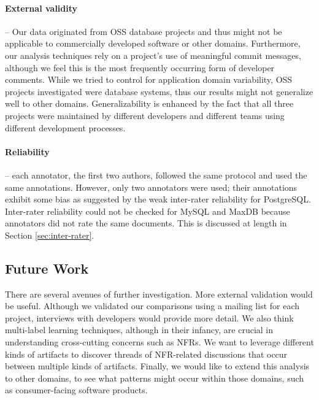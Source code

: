 \documentclass[smallextended]{svjour3}       %
\begin{document}
\paragraph{External validity} -- %
Our data originated from OSS database projects and thus might not be applicable to commercially developed software or other domains. 
Furthermore, our analysis techniques rely on a project's use of meaningful commit messages, although we feel this is the most frequently occurring form
of developer comments. 
While we tried to control for application domain variability, OSS
projects investigated were database systems, thus our results might
not generalize well to other domains. Generalizability is enhanced by
the fact that all three projects
were maintained by different developers and different teams using
different development processes.


\paragraph{Reliability} -- each annotator, the first two authors, followed the same protocol and used the same annotations. 
However, only two annotators were used; their annotations exhibit some
bias as suggested by the weak inter-rater reliability for
PostgreSQL. Inter-rater reliability could not be checked for MySQL and
MaxDB because annotators did not rate the same documents. This is discussed at length in Section \ref{sec:inter-rater}.

\subsection{Future Work}
There are several avenues of further investigation.  
More external validation would be useful. 
Although we validated our comparisons using a mailing list for each project, interviews with developers would provide more detail. 
We also think multi-label learning techniques, although in their infancy, are crucial in understanding cross-cutting concerns such as NFRs. 
We want to leverage different kinds of artifacts to discover threads of NFR-related discussions that occur between multiple kinds of artifacts.
Finally, we would like to extend this analysis to other domains, to
see what patterns might occur within those domains, such as consumer-facing software products.
\end{document}
